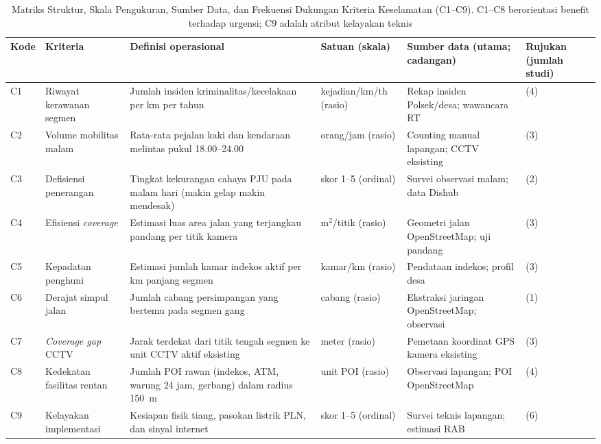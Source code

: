 \documentclass[10pt,twocolumn,a4paper]{article}
\begin{document}
\begin{table}[!t]
\centering
\caption{Matriks Struktur, Skala Pengukuran, Sumber Data, dan Frekuensi Dukungan Kriteria Keselamatan (C1--C9). C1--C8 berorientasi benefit terhadap urgensi; C9 adalah atribut kelayakan teknis}\label{tab:criteriaC}
\scriptsize
\begin{tabular}{@{}P{0.55cm}P{2.2cm}P{4.8cm}P{1.8cm}P{4.2cm}P{2.8cm}@{}}
\toprule
Kode & Kriteria & Definisi operasional & Satuan (skala) & Sumber data (utama; cadangan) & Rujukan (jumlah studi) \\
\midrule
C1 & Riwayat kerawanan segmen & Jumlah insiden kriminalitas/kecelakaan per km per tahun & kejadian/km/th (rasio) & Rekap insiden Polsek/desa; wawancara RT & \cite{feiz,kanj,baddour,alma} (4) \\
C2 & Volume mobilitas malam & Rata-rata pejalan kaki dan kendaraan melintas pukul 18.00--24.00 & orang/jam (rasio) & Counting manual lapangan; CCTV eksisting & \cite{feiz,kab,alma} (3) \\
C3 & Defisiensi penerangan & Tingkat kekurangan cahaya PJU pada malam hari (makin gelap makin mendesak) & skor 1--5 (ordinal) & Survei observasi malam; data Dishub & \cite{baddour,zheng} (2) \\
C4 & Efisiensi \textit{coverage} & Estimasi luas area jalan yang terjangkau pandang per titik kamera & m$^2$/titik (rasio) & Geometri jalan OpenStreetMap; uji pandang & \cite{wang,shid,yuhang} (3) \\
C5 & Kepadatan penghuni & Estimasi jumlah kamar indekos aktif per km panjang segmen & kamar/km (rasio) & Pendataan indekos; profil desa \cite{bps} & \cite{feiz,choi,yuhang} (3) \\
C6 & Derajat simpul jalan & Jumlah cabang persimpangan yang bertemu pada segmen gang & cabang (rasio) & Ekstraksi jaringan OpenStreetMap; observasi & \cite{wang} (1) \\
C7 & \textit{Coverage gap} CCTV & Jarak terdekat dari titik tengah segmen ke unit CCTV aktif eksisting & meter (rasio) & Pemetaan koordinat GPS kamera eksisting & \cite{wang,shid,yuhang} (3) \\
C8 & Kedekatan fasilitas rentan & Jumlah POI rawan (indekos, ATM, warung 24 jam, gerbang) dalam radius 150~m & unit POI (rasio) & Observasi lapangan; POI OpenStreetMap & \cite{feiz,ahmed,choi,baddour} (4) \\
C9 & Kelayakan implementasi & Kesiapan fisik tiang, pasokan listrik PLN, dan sinyal internet & skor 1--5 (ordinal) & Survei teknis lapangan; estimasi RAB & \cite{wang,ahmed,kanj,baddour,zheng,yuhang} (6) \\
\bottomrule
\end{tabular}
\end{table}
\end{document}
